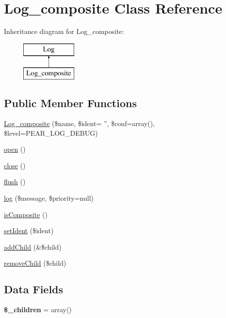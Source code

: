 \hypertarget{class_log__composite}{
\section{Log\_\-composite Class Reference}
\label{class_log__composite}
}
Inheritance diagram for Log\_\-composite:\begin{figure}[H]
\begin{center}
\leavevmode
\includegraphics[height=2.000000cm]{class_log__composite}
\end{center}
\end{figure}
\subsection*{Public Member Functions}
\begin{DoxyCompactItemize}
\item 
\hyperlink{class_log__composite_a3bc0d26b9f7c00bbf4caf2964ea0b501}{Log\_\-composite} (\$name, \$ident= '', \$conf=array(), \$level=PEAR\_\-LOG\_\-DEBUG)
\item 
\hyperlink{class_log__composite_a44a2ac59a3b91f8c18905dce700934d6}{open} ()
\item 
\hyperlink{class_log__composite_aa69c8bf1f1dcf4e72552efff1fe3e87e}{close} ()
\item 
\hyperlink{class_log__composite_a7751f77b5263bcf940ece6e824a05b38}{flush} ()
\item 
\hyperlink{class_log__composite_ac3758dfa38a67df158a446847cf06413}{log} (\$message, \$priority=null)
\item 
\hyperlink{class_log__composite_a2c140997a6e82a14ed58842d26bbb2c5}{isComposite} ()
\item 
\hyperlink{class_log__composite_a9d8352d257344340d7a5b9c081d2a0d9}{setIdent} (\$ident)
\item 
\hyperlink{class_log__composite_a69f884b1a42cb59ba09070fa0229d733}{addChild} (\&\$child)
\item 
\hyperlink{class_log__composite_afeed0fd389f43d6d9efbe9ef1ca9e2d1}{removeChild} (\$child)
\end{DoxyCompactItemize}
\subsection*{Data Fields}
\begin{DoxyCompactItemize}
\item 
\hypertarget{class_log__composite_a8fa4d4087d153e03788aeece675aefb9}{
{\bfseries \$\_\-children} = array()}
\label{class_log__composite_a8fa4d4087d153e03788aeece675aefb9}

\end{DoxyCompactItemize}


